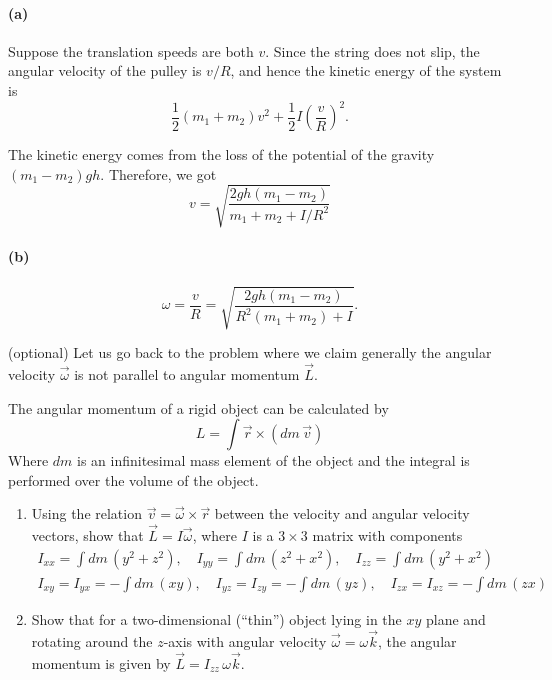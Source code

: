 \documentclass{article}
\begin{document}
\begin{solution}
	\paragraph{(a)} Suppose the translation speeds are both $v$. Since the string does not slip, the angular velocity of the pulley is $v/R$, and hence the kinetic energy of the system is
	\[ \frac{1}{2}(m_1 + m_2)v^2 + \frac{1}{2} I \left( \frac{v}{R} \right)^2. \]

	The kinetic energy comes from the loss of the potential of the gravity $(m_1 - m_2)gh$. Therefore, we got
	\[ v = \sqrt{\frac{2gh(m_1 - m_2)}{m_1 + m_2 + I/R^2}} \]

	\paragraph{(b)} 
	\[ \omega = \frac{v}{R} = \sqrt{\frac{2gh(m_1 - m_2)}{R^2(m_1 + m_2) + I}}. \]
\end{solution}



\begin{problem}
(optional) Let us go back to the problem where we claim generally the angular velocity $\vec\omega$ is not parallel to angular momentum $\vec L$.

The angular momentum of a rigid object can be calculated by
\[
  L=\int\vec r\times(dm\,\vec v)
\]
Where $dm$ is an infinitesimal mass element of the object and the integral is performed over the volume of the object.
\begin{enumerate}
  \item[a)] Using the relation $\vec v=\vec\omega\times\vec r$ between the velocity and angular velocity vectors, show that $\vec L=I\vec\omega$, where $I$ is a $3\times3$ matrix with components
  \begin{gather*}
    I_{xx}=\int dm\,(y^2+z^2),\quad I_{yy}=\int dm\,(z^2+x^2),\quad I_{zz}=\int dm\,(y^2+x^2) \\
    I_{xy}=I_{yx}=-\int dm\,(xy),\quad I_{yz}=I_{zy}=-\int dm\,(yz),\quad I_{zx}=I_{xz}=-\int dm\,(zx)
  \end{gather*}
  \item[b)] Show that for a two-dimensional (``thin'') object lying in the $xy$ plane and rotating around the $z$-axis with angular velocity $\vec\omega=\omega\vec k$, the angular momentum is given by $\vec L=I_{zz}\,\omega\vec k$.
\end{enumerate}
\end{problem}
\end{document}
